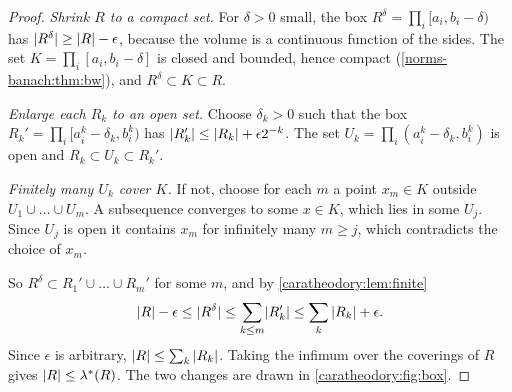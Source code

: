 \begin{notechapter}
\begin{proof}
\emph{Shrink $R$ to a compact set.} For $\delta > 0$ small, the box
$R^\delta = \prod_i[a_i, b_i - \delta)$ has
$\lvert R^\delta\rvert\geq\left|R\right| - \epsilon$, because the volume is a
continuous function of the sides. The set
$K = \prod_i[a_i, b_i - \delta]$ is closed and bounded, hence compact
(\cref{norms-banach:thm:bw}), and $R^\delta\subset K\subset R$.

\emph{Enlarge each $R_k$ to an open set.} Choose $\delta_k > 0$ such
that the box $R_k' = \prod_i[a_i^k - \delta_k, b_i^k)$ has
$\lvert R_k'\rvert\leq\left|R_k\right| + \epsilon2^{-k}$. The set
$U_k = \prod_i(a_i^k - \delta_k, b_i^k)$ is open and
$R_k\subset U_k\subset R_k'$.

\emph{Finitely many $U_k$ cover $K$.} If not, choose for each $m$ a
point $x_m\in K$ outside $U_1\cup\dots\cup U_m$. A subsequence
converges to some $x\in K$, which lies in some $U_j$. Since $U_j$ is
open it contains $x_m$ for infinitely many $m\geq j$, which contradicts
the choice of $x_m$.

So $R^\delta\subset R_1'\cup\dots\cup R_m'$ for some $m$, and by
\cref{caratheodory:lem:finite}
\[
  \left|R\right| - \epsilon\leq\lvert R^\delta\rvert
  \leq\sum_{k\leq m}\lvert R_k'\rvert
  \leq\sum_k\left|R_k\right| + \epsilon .
\]
Since $\epsilon$ is arbitrary, $\left|R\right|\leq\sum_k\left|R_k\right|$. Taking the
infimum over the coverings of $R$ gives $\left|R\right|\leq\lambda^*(R)$. The
two changes are drawn in \cref{caratheodory:fig:box}.
\end{proof}


\end{notechapter}
